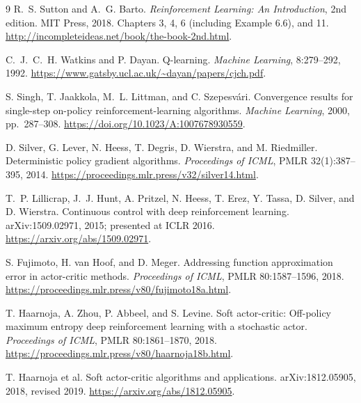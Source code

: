 \documentclass[11pt,a4paper]{article}
\theoremstyle{definition}
\theoremstyle{plain}
\theoremstyle{remark}
\begin{document}
\clearpage
{}
{}
\begin{thebibliography}{9}
R.~S. Sutton and A.~G. Barto.
\emph{Reinforcement Learning: An Introduction}, 2nd edition.
MIT Press, 2018. Chapters 3, 4, 6 (including Example 6.6), and 11.
\url{http://incompleteideas.net/book/the-book-2nd.html}.

C.~J.~C.~H. Watkins and P. Dayan.
Q-learning.
\emph{Machine Learning}, 8:279--292, 1992.
\url{https://www.gatsby.ucl.ac.uk/~dayan/papers/cjch.pdf}.

S. Singh, T. Jaakkola, M.~L. Littman, and C. Szepesv\'ari.
Convergence results for single-step on-policy reinforcement-learning algorithms.
\emph{Machine Learning}, 2000, pp.~287--308.
\url{https://doi.org/10.1023/A:1007678930559}.

D. Silver, G. Lever, N. Heess, T. Degris, D. Wierstra, and M. Riedmiller.
Deterministic policy gradient algorithms.
\emph{Proceedings of ICML}, PMLR 32(1):387--395, 2014.
\url{https://proceedings.mlr.press/v32/silver14.html}.

T.~P. Lillicrap, J.~J. Hunt, A. Pritzel, N. Heess, T. Erez,
Y. Tassa, D. Silver, and D. Wierstra.
Continuous control with deep reinforcement learning.
arXiv:1509.02971, 2015; presented at ICLR 2016.
\url{https://arxiv.org/abs/1509.02971}.

S. Fujimoto, H. van Hoof, and D. Meger.
Addressing function approximation error in actor-critic methods.
\emph{Proceedings of ICML}, PMLR 80:1587--1596, 2018.
\url{https://proceedings.mlr.press/v80/fujimoto18a.html}.

T. Haarnoja, A. Zhou, P. Abbeel, and S. Levine.
Soft actor-critic: Off-policy maximum entropy deep reinforcement learning with a stochastic actor.
\emph{Proceedings of ICML}, PMLR 80:1861--1870, 2018.
\url{https://proceedings.mlr.press/v80/haarnoja18b.html}.

T. Haarnoja et al.
Soft actor-critic algorithms and applications.
arXiv:1812.05905, 2018, revised 2019.
\url{https://arxiv.org/abs/1812.05905}.
\end{thebibliography}
\end{document}
